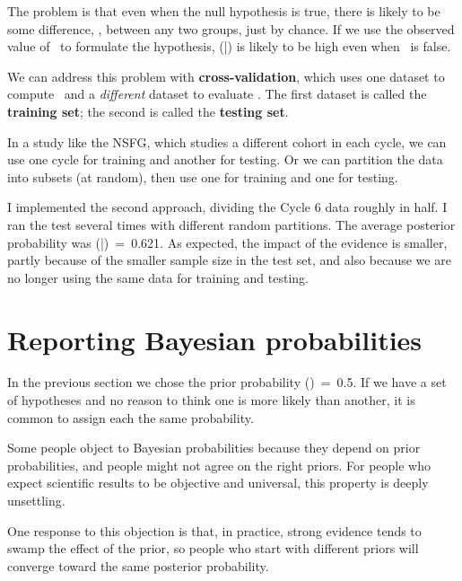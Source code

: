 \documentclass[12pt]{book}
\begin{document}
The problem is that even when the null hypothesis is true, there is
likely to be some difference, \mydelta, between any two groups, just by
chance.  If we use the observed value of \mydelta~to formulate the
hypothesis, \Prob(\HH{}|\E) is likely to be high even when
\HH{}~is false.

We can address this problem with {\bf cross-validation}, which uses
one dataset to compute \mydelta~and a {\em different} dataset to
evaluate \HH{}.  The first dataset is called the {\bf training set};
the second is called the {\bf testing set}.

In a study like the NSFG, which studies a different cohort in each
cycle, we can use one cycle for training and another for testing.
Or we can partition the data into subsets (at random), then use
one for training and one for testing.

I implemented the second approach, dividing the Cycle 6 data roughly
in half.  I ran the test several times with different random partitions.
The average posterior probability was \Prob(\HH{}|\E)~=~0.621.
As expected, the impact of the evidence is smaller, partly because of
the smaller sample size in the test set, and also because we are no
longer using the same data for training and testing.



\section{Reporting Bayesian probabilities}

In the previous section we chose the prior probability \Prob(\HH{})~=~0.5.
If we have a set of hypotheses and no reason to think one is more
likely than another, it is common to assign each the same probability.

Some people object to Bayesian probabilities because they depend on
prior probabilities, and people might not agree on
the right priors.  For people who expect scientific results to be
objective and universal, this property is deeply unsettling.

One response to this objection is that, in practice, strong evidence
tends to swamp the effect of the prior, so people who start with
different priors will converge toward the same posterior
probability.
\end{document}

